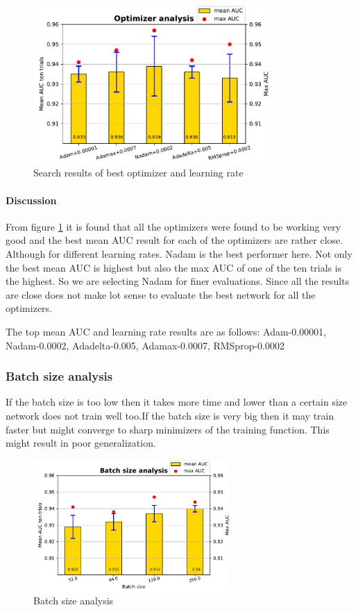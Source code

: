 \begin{figure}[ht]
\centering
\includegraphics[height= 6cm]{images/contrastive/contrastive_loss_optimizer_bar}
\caption{Search results of best optimizer and learning rate}
\label{fig:contrastive_loss_optimizer_bar}
\end{figure}

\paragraph{Discussion } 
From figure \ref{fig:contrastive_loss_optimizer_bar} it is found that all the optimizers were found to be working very good and the best mean AUC result for each of the optimizers are rather close.
Although for different learning rates. Nadam is the best performer here.
Not only the best mean AUC is highest but also the max AUC of one of the ten trials is the highest. So we are selecting Nadam for finer evaluations. Since all the results are close does not make lot sense to evaluate 
the best network for all the optimizers. 

The top mean AUC and learning rate results are as follows: Adam-0.00001, Nadam-0.0002, Adadelta-0.005, Adamax-0.0007, RMSprop-0.0002

\subsubsection{Batch size analysis}
If the batch size is too low then it takes more time and lower than a certain size network does not train well too.If the batch size is very big then it may train faster but might converge 
to sharp minimizers of the training function. This might result in poor generalization.

\begin{figure}[ht]
\centering
\includegraphics[height= 5cm]{images/contrastive/contrastive_loss_batchsize_bar}
\caption{Batch size analysis}
\label{fig:contrastive_loss_batchsize_bar}
\end{figure}


